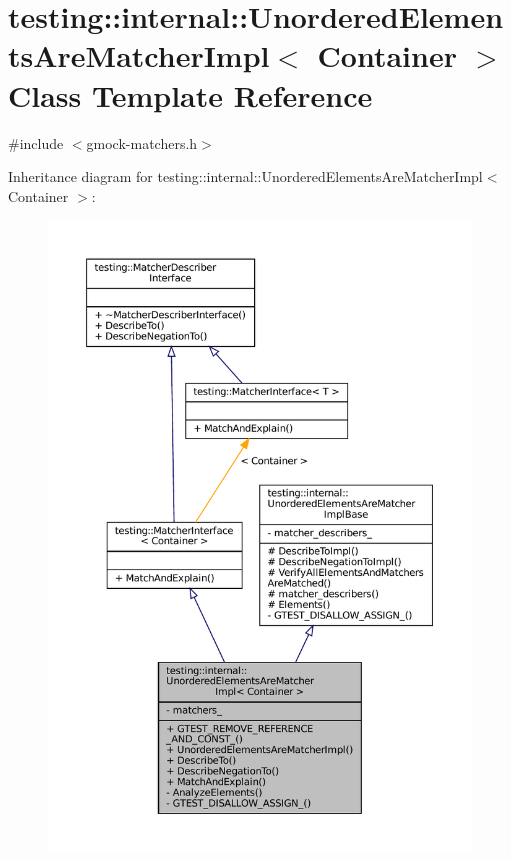\hypertarget{classtesting_1_1internal_1_1UnorderedElementsAreMatcherImpl}{}\section{testing\+:\+:internal\+:\+:Unordered\+Elements\+Are\+Matcher\+Impl$<$ Container $>$ Class Template Reference}
\label{classtesting_1_1internal_1_1UnorderedElementsAreMatcherImpl}


{\ttfamily \#include $<$gmock-\/matchers.\+h$>$}



Inheritance diagram for testing\+:\+:internal\+:\+:Unordered\+Elements\+Are\+Matcher\+Impl$<$ Container $>$\+:
\nopagebreak
\begin{figure}[H]
\begin{center}
\leavevmode
\includegraphics[width=350pt]{classtesting_1_1internal_1_1UnorderedElementsAreMatcherImpl__inherit__graph}
\end{center}
\end{figure}


